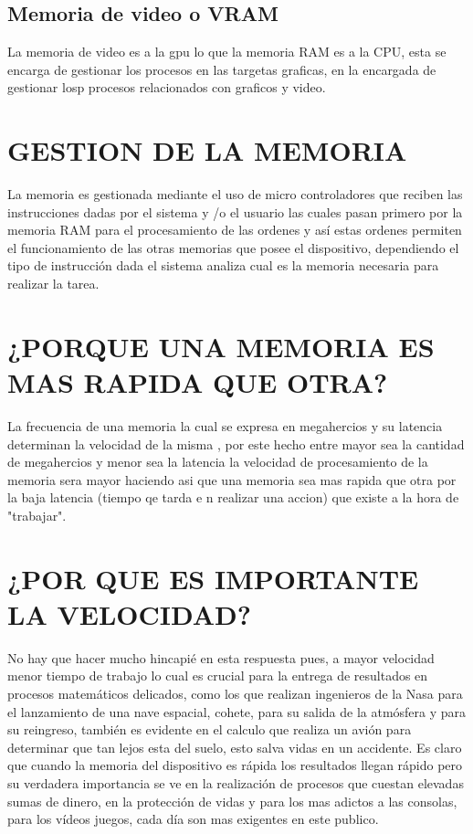 \documentclass{article}
\begin{document}
\subsection{Memoria de video o VRAM}
La memoria de video es a la gpu lo que la memoria RAM es a la CPU, esta se encarga de gestionar los procesos en las targetas graficas, en la encargada de gestionar losp procesos relacionados con graficos y video.

\section{GESTION DE LA MEMORIA}
La memoria es gestionada mediante el uso de micro controladores que reciben las instrucciones dadas por el sistema y /o el usuario las cuales pasan primero por la memoria RAM para el procesamiento de las ordenes y así estas ordenes permiten el funcionamiento de las otras memorias que posee el dispositivo, dependiendo el tipo de instrucción dada el sistema analiza cual es la memoria necesaria para realizar la tarea.

\section{¿PORQUE UNA MEMORIA ES MAS RAPIDA QUE OTRA?}
La  frecuencia  de una memoria la cual se expresa en megahercios y su latencia determinan la velocidad de la misma , por este hecho entre mayor sea la cantidad de megahercios y menor sea la latencia la velocidad de procesamiento de la memoria sera mayor haciendo asi que una memoria sea mas rapida que otra por la baja latencia (tiempo qe tarda e n realizar una accion) que existe a la hora de "trabajar".

\section{¿POR QUE ES IMPORTANTE LA VELOCIDAD?}
No hay que hacer mucho hincapié en esta respuesta pues, a mayor velocidad menor tiempo de trabajo lo cual es crucial para la entrega de resultados en procesos matemáticos delicados, como los que realizan ingenieros de la Nasa para el lanzamiento de una nave espacial, cohete, para su salida de la atmósfera y para su reingreso, también es evidente en el calculo que realiza un avión para determinar que tan lejos esta del suelo, esto salva vidas en un accidente. Es claro que cuando la memoria del dispositivo es rápida los resultados llegan rápido pero su verdadera importancia se ve en la realización de procesos que cuestan elevadas sumas de dinero, en la protección de vidas y para los mas adictos a las consolas, para los vídeos juegos, cada día son mas exigentes en este publico. 


\end{document}
